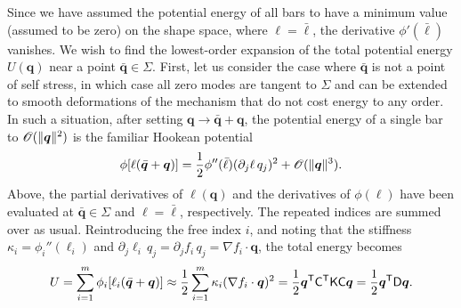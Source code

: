 Since we have assumed the potential energy of all bars to have a minimum value (assumed to be zero) on the shape space, where $\ell = \bar{\ell}$, the derivative $\phi'(\bar{\ell})$ vanishes.
We wish to find the lowest-order expansion of the total potential energy $U(\bm{q})$ near a point $\bar{\bm{q}} \in \Sigma$.
First, let us consider the case where $\bar{\bm{q}}$ is not a point of self stress, in which case all zero modes are tangent to $\Sigma$ and can be extended to smooth deformations of the mechanism that do not cost energy to any order.
In such a situation, after setting $\bm{q} \to \bar{\bm{q}} + \bm{q}$, the potential energy of a single bar to $\mathscr{O}(\lVert\bm{q}\rVert^2)$ is the familiar Hookean potential
%
\begin{equation}
  \phi[\ell(\bar{\bm{q}} + \bm{q})] =  \frac{1}{2}\phi''(\bar{\ell})(\partial_j \ell\,q_j)^2 + \mathscr{O}(\lVert\bm{q}\rVert^3).
\end{equation}
%
Above, the partial derivatives of $\ell(\bm{q})$ and the derivatives of $\phi(\ell)$ have been evaluated at $\bar{\bm{q}} \in \Sigma$ and $\ell = \bar{\ell}$, respectively.
The repeated indices are summed over as usual.
Reintroducing the free index $i$, and noting that the stiffness $\kappa_{i} = \phi_{i}''(\ell_{i})$ and $\partial_{j}\ell_{i}\,q_{j} = \partial_{j}f_{i}\,q_{j} = \nabla f_{i}\cdot\bm{q}$, the total energy becomes
%
\begin{equation}
  U = \sum_{i=1}^m \phi_i[\ell_i(\bar{\bm{q}} + \bm{q})] \approx \frac{1}{2} \sum_{i=1}^m \kappa_i (\nabla f_i\cdot\bm{q})^2 = \frac{1}{2}\bm{q}^\mathsf{T}\mathsf{C}^\mathsf{T}\mathsf{K}\mathsf{C}\bm{q} = \frac{1}{2}\bm{q}^\mathsf{T}\mathsf{D}\bm{q}.
  \label{sm:eq:regenergy}
\end{equation}

